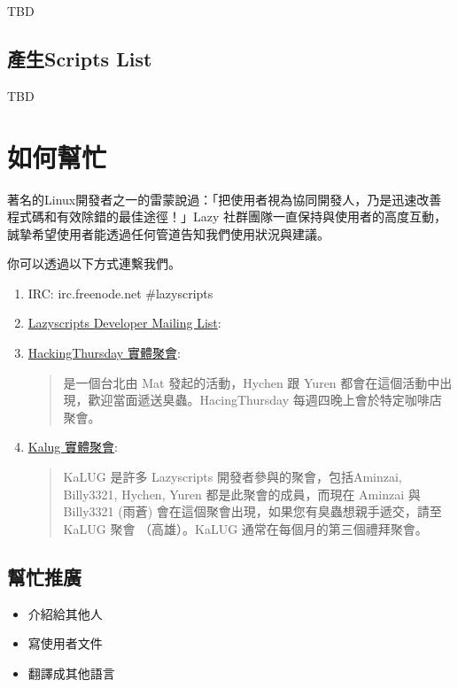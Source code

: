 \documentclass[letterpaper,10pt,english]{manual}
\begin{document}
TBD


\section{產生Scripts List}

TBD

\resetcurrentobjects


\chapter{如何幫忙}

著名的Linux開發者之一的雷蒙說過：「把使用者視為協同開發人，乃是迅速改善程式碼和有效除錯的最佳途徑！」Lazy 社群團隊一直保持與使用者的高度互動，誠摯希望使用者能透過任何管道告知我們使用狀況與建議。

你可以透過以下方式連繫我們。
\begin{enumerate}
\item {} 
IRC: irc.freenode.net \#lazyscripts

\item {} 
\href{http://groups.google.com/group/lazyscripts-dev/}{Lazyscripts Developer Mailing List}:

\item {} 
\href{http://hack.ingday.org}{HackingThursday 實體聚會}:
\begin{quote}

是一個台北由 Mat 發起的活動，Hychen 跟 Yuren 都會在這個活動中出現，歡迎當面遞送臭蟲。HacingThursday 每週四晚上會於特定咖啡店聚會。
\end{quote}

\item {} 
\href{http://kalug.linux.org.tw}{Kalug 實體聚會}:
\begin{quote}

KaLUG 是許多 Lazyscripts 開發者參與的聚會，包括Aminzai, Billy3321, Hychen, Yuren 都是此聚會的成員，而現在 Aminzai 與 Billy3321 (雨蒼) 會在這個聚會出現，如果您有臭蟲想親手遞交，請至 KaLUG 聚會 （高雄）。KaLUG 通常在每個月的第三個禮拜聚會。
\end{quote}

\end{enumerate}


\section{幫忙推廣}
\begin{itemize}
\item {} 
介紹給其他人

\item {} 
寫使用者文件

\item {} 
翻譯成其他語言

\end{itemize}
\end{document}
